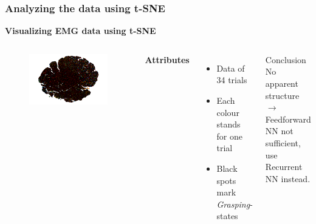 \documentclass{beamer}
\begin{document}
\begin{frame}
	\frametitle{Analyzing the data using t-SNE}
	\textbf{Visualizing EMG data using t-SNE}
	\begin{columns}
		\begin{figure}[ht]
			\centering
			\includegraphics[width=1.0\textwidth, trim={1.5cm 0cm 1.5cm 0cm},clip]{images/emg_tsne.png}
		\end{figure}
		
		\textbf{Attributes}
		\begin{itemize}
			\item Data of 34 trials
			\item Each colour stands for one trial
			\item Black spots mark \emph{Grasping}-states
		\end{itemize}
		\begin{block}{Conclusion}
			No apparent structure $\rightarrow$ Feedforward NN not sufficient, use Recurrent NN instead.
		\end{block}		
	\end{columns}	
\end{frame}
\end{document}
